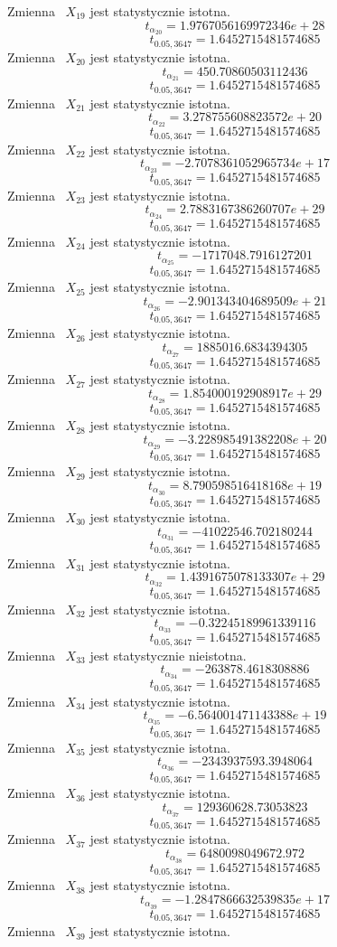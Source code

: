 Zmienna ~$X_{19}$ jest statystycznie istotna.
\[t_{\alpha_{20}} = 1.9767056169972346e+28\]
\[t_{0.05, 3647} = 1.6452715481574685\]
Zmienna ~$X_{20}$ jest statystycznie istotna.
\[t_{\alpha_{21}} = 450.70860503112436\]
\[t_{0.05, 3647} = 1.6452715481574685\]
Zmienna ~$X_{21}$ jest statystycznie istotna.
\[t_{\alpha_{22}} = 3.278755608823572e+20\]
\[t_{0.05, 3647} = 1.6452715481574685\]
Zmienna ~$X_{22}$ jest statystycznie istotna.
\[t_{\alpha_{23}} = -2.7078361052965734e+17\]
\[t_{0.05, 3647} = 1.6452715481574685\]
Zmienna ~$X_{23}$ jest statystycznie istotna.
\[t_{\alpha_{24}} = 2.7883167386260707e+29\]
\[t_{0.05, 3647} = 1.6452715481574685\]
Zmienna ~$X_{24}$ jest statystycznie istotna.
\[t_{\alpha_{25}} = -1717048.7916127201\]
\[t_{0.05, 3647} = 1.6452715481574685\]
Zmienna ~$X_{25}$ jest statystycznie istotna.
\[t_{\alpha_{26}} = -2.901343404689509e+21\]
\[t_{0.05, 3647} = 1.6452715481574685\]
Zmienna ~$X_{26}$ jest statystycznie istotna.
\[t_{\alpha_{27}} = 1885016.6834394305\]
\[t_{0.05, 3647} = 1.6452715481574685\]
Zmienna ~$X_{27}$ jest statystycznie istotna.
\[t_{\alpha_{28}} = 1.854000192908917e+29\]
\[t_{0.05, 3647} = 1.6452715481574685\]
Zmienna ~$X_{28}$ jest statystycznie istotna.
\[t_{\alpha_{29}} = -3.228985491382208e+20\]
\[t_{0.05, 3647} = 1.6452715481574685\]
Zmienna ~$X_{29}$ jest statystycznie istotna.
\[t_{\alpha_{30}} = 8.790598516418168e+19\]
\[t_{0.05, 3647} = 1.6452715481574685\]
Zmienna ~$X_{30}$ jest statystycznie istotna.
\[t_{\alpha_{31}} = -41022546.702180244\]
\[t_{0.05, 3647} = 1.6452715481574685\]
Zmienna ~$X_{31}$ jest statystycznie istotna.
\[t_{\alpha_{32}} = 1.4391675078133307e+29\]
\[t_{0.05, 3647} = 1.6452715481574685\]
Zmienna ~$X_{32}$ jest statystycznie istotna.
\[t_{\alpha_{33}} = -0.32245189961339116\]
\[t_{0.05, 3647} = 1.6452715481574685\]
Zmienna ~$X_{33}$ jest statystycznie nieistotna.
\[t_{\alpha_{34}} = -263878.4618308886\]
\[t_{0.05, 3647} = 1.6452715481574685\]
Zmienna ~$X_{34}$ jest statystycznie istotna.
\[t_{\alpha_{35}} = -6.564001471143388e+19\]
\[t_{0.05, 3647} = 1.6452715481574685\]
Zmienna ~$X_{35}$ jest statystycznie istotna.
\[t_{\alpha_{36}} = -2343937593.3948064\]
\[t_{0.05, 3647} = 1.6452715481574685\]
Zmienna ~$X_{36}$ jest statystycznie istotna.
\[t_{\alpha_{37}} = 129360628.73053823\]
\[t_{0.05, 3647} = 1.6452715481574685\]
Zmienna ~$X_{37}$ jest statystycznie istotna.
\[t_{\alpha_{38}} = 6480098049672.972\]
\[t_{0.05, 3647} = 1.6452715481574685\]
Zmienna ~$X_{38}$ jest statystycznie istotna.
\[t_{\alpha_{39}} = -1.2847866632539835e+17\]
\[t_{0.05, 3647} = 1.6452715481574685\]
Zmienna ~$X_{39}$ jest statystycznie istotna.
